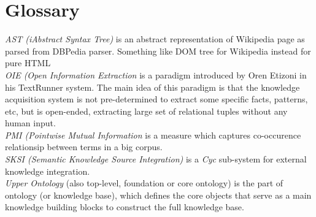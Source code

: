 % 
\chapter{Glossary}

\emph{AST (iAbstract Syntax Tree)} is an abstract representation of Wikipedia 
page as parsed from DBPedia parser. Something like DOM tree for Wikipedia 
instead for pure HTML\\

\emph{OIE (Open Information Extraction} is a paradigm introduced by Oren Etizoni
in his TextRunner system. The main idea of this paradigm is that the knowledge 
acquisition system is not pre-determined to extract some specific facts, 
patterns, etc, but is open-ended, extracting large set of relational tuples 
without any human input.\\

\emph{PMI (Pointwise Mutual Information} is a measure which captures 
co-occurence relationsip between terms in a big corpus.\\

\emph{SKSI (Semantic Knowledge Source Integration)} is a \emph{Cyc} sub-system
for external knowledge integration.\\

\emph{Upper Ontology} (also top-level, foundation or core ontology) is the part
of ontology (or knowledge base), which defines the core objects that serve as a
main knowledge building blocks to construct the full knowledge base.\\
